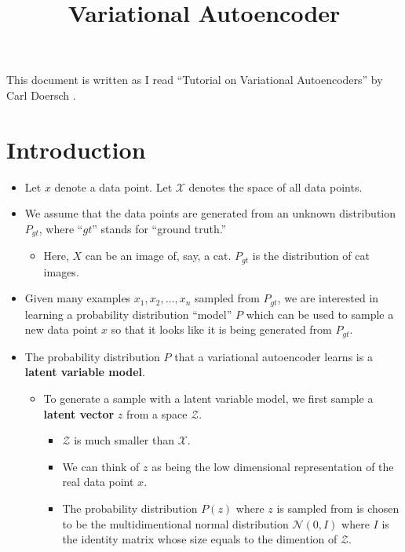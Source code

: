 \documentclass[10pt]{article}
\title{Variational Autoencoder}
\author{}
\begin{document}
  \maketitle

  This document is written as I read ``Tutorial on Variational Autoencoders'' by Carl Doersch \cite{doersch:2016}.

  \section{Introduction}

  \begin{itemize}
  	\item Let $x$ denote a data point. Let $\mathcal{X}$ denotes the space of all data points.

  	\item We assume that the data points are generated from an unknown distribution $P_{gt}$, where ``$gt$'' stands for ``ground truth.''
  	\begin{itemize}
  	  \item Here, $X$ can be an image of, say, a cat. $P_{gt}$ is the distribution of cat images.
  	\end{itemize}

  	\item Given many examples $x_1, x_2, \dotsc, x_n$ sampled from $P_{gt}$, we are interested in learning a probability distribution ``model'' $P$ which can be used to sample a new data point $x$ so that it looks like it is being generated from $P_{gt}$.

  	\item The probability distribution $P$ that a variational autoencoder learns is a \textbf{latent variable model}.

  	\begin{itemize}
  	  \item To generate a sample with a latent variable model, we first sample a \textbf{latent vector} $z$ from a space $\mathcal{Z}$.
  	  \begin{itemize}
  	  	\item $\mathcal{Z}$ is much smaller than $\mathcal{X}$.
  	  	\item We can think of $z$ as being the low dimensional representation of the real data point $x$.
  	  	\item The probability distribution $P(z)$ where $z$ is sampled from is chosen to be the multidimentional normal distribution $\mathcal{N}(0, I)$ where $I$ is the identity matrix whose size equals to the dimention of $\mathcal{Z}$.
  	  \end{itemize}


\end{itemize}
\end{itemize}
\end{document}
